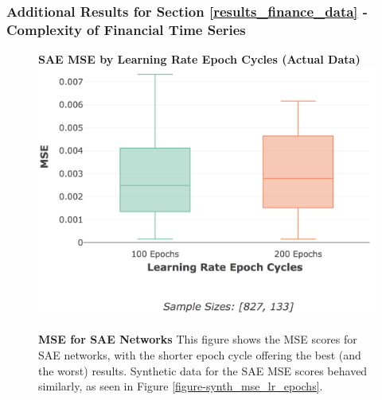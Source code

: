 \documentclass[a4paper,11pt,oneside]{article}
\theoremstyle{plain}
\theoremstyle{definition}
\begin{document}
	\subsubsection{Additional Results for Section \ref{results_finance_data} - Complexity of Financial Time Series}\label{results_appendix_finance_data}
	
		\begin{figure}[H]
		\centering 
		\textbf{SAE MSE by Learning Rate Epoch Cycles (Actual Data)}
		\includegraphics[scale=0.3]{images/results/8_appendix/actual_mse_lr_epochs.png}
		\caption[SAE MSE by Learning Rate Epoch Cycles (Actual Data)]{\textbf{MSE for SAE Networks} 
			\newline This figure shows the MSE scores for SAE networks, with the shorter epoch cycle offering the best (and the worst) results. Synthetic data for the SAE MSE scores behaved similarly, as seen in Figure \ref{figure-synth_mse_lr_epochs}.}
		\label{figure-actual_mse_lr_epochs}
	\end{figure}%
	
\end{document}
